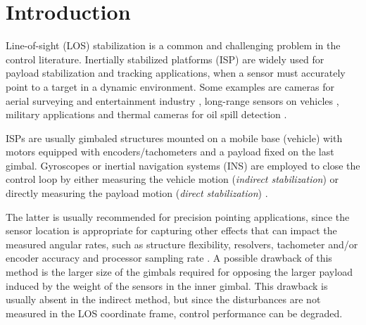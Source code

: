 \section{Introduction}
\label{sec:intro}


Line-of-sight (LOS) stabilization is a common and challenging problem in the control literature. Inertially stabilized platforms (ISP) are widely used for payload stabilization and tracking applications, when a sensor must accurately point to a target in a dynamic environment.
%
Some examples are cameras for aerial surveying and entertainment industry \cite{Hurak2009}, long-range sensors on vehicles \cite{Debruin2008}, military applications \cite{Kazemy2007} and thermal cameras for oil spill detection \cite{skjelten2011ship}.

ISPs are usually gimbaled structures mounted on a mobile base (vehicle) with motors equipped with encoders/tachometers and a payload fixed on the last gimbal. Gyroscopes or inertial navigation systems (INS) are employed to close the control loop by either measuring the vehicle motion (\textit{indirect stabilization}) or directly measuring the payload motion (\textit{direct stabilization}) \cite{Kennedy2003}.

The latter is usually recommended for precision pointing applications, since the sensor location is appropriate for capturing other effects that can impact the measured angular rates, such as structure flexibility, resolvers, tachometer and/or encoder accuracy and processor sampling rate \cite{Kennedy2003}. 
%
A possible drawback of this method is the larger size of the gimbals required for opposing the larger payload induced by the weight of the sensors in the inner gimbal.
%
This drawback is usually absent in the indirect method, but since the disturbances are not measured in the LOS coordinate frame, control performance can be degraded.

